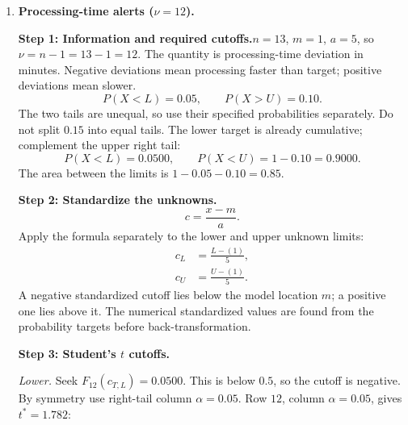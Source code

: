 \begin{enumerate}[leftmargin=*,label=\textbf{\arabic*.},itemsep=12pt,parsep=3pt,topsep=5pt]
\par\noindent\begin{minipage}{\linewidth}
\par\textbf{Step 7: Interpretation.}\nopagebreak\enspace The limits are $(-4.36,3.36)$ g under $t$ and $(-3.44,2.44)$ g under normal, enclosing approximately $95\%$ of mass deviations with $2.5\%$ in each tail. The lower limits are below target and the upper limits above target. Each normal endpoint is about $0.92$ g closer to the mean; the percentage errors differ because the endpoint magnitudes differ.
\end{minipage}\par
\item \begin{minipage}[t]{\linewidth}\textbf{Processing-time alerts ($\nu=12$).}\nopagebreak
\par\textbf{Step 1: Information and required cutoffs.}\nopagebreak\enspace $n=13$, $m=1$, $a=5$, so $\nu=n-1=13-1=12$. The quantity is processing-time deviation in minutes. Negative deviations mean processing faster than target; positive deviations mean slower.\[
P(X<L)=0.05,\qquad P(X>U)=0.10.
\]
The two tails are unequal, so use their specified probabilities separately. Do not split $0.15$ into equal tails. The lower target is already cumulative; complement the upper right tail:\[
P(X<L)=0.0500,\qquad P(X<U)=1-0.10=0.9000.
\]
The area between the limits is $1-0.05-0.10=0.85$.
\end{minipage}\par
\par\noindent\begin{minipage}{\linewidth}
\par\textbf{Step 2: Standardize the unknowns.}\nopagebreak\enspace \[
c=\frac{x-m}{a}.
\]
Apply the formula separately to the lower and upper unknown limits:
\[
\begin{aligned}c_L&=\frac{L-(1)}{5},\\c_U&=\frac{U-(1)}{5}.\end{aligned}
\]
A negative standardized cutoff lies below the model location $m$; a positive one lies above it. The numerical standardized values are found from the probability targets before back-transformation.
\end{minipage}\par
\par\noindent\begin{minipage}{\linewidth}
\par\textbf{Step 3: Student's $t$ cutoffs.}\nopagebreak\enspace \par\textit{Lower.} Seek $F_{12}(c_{T,L})=0.0500$. This is below $0.5$, so the cutoff is negative. By symmetry use right-tail column $\alpha=0.05$. Row $12$, column $\alpha=0.05$, gives $t^*=1.782$:\[
\]
\end{minipage}
\end{enumerate}
